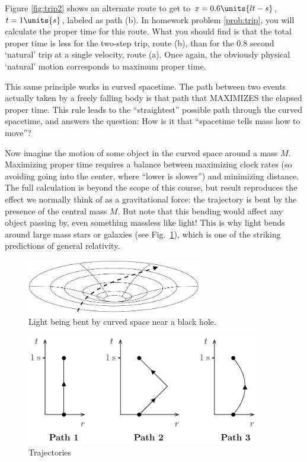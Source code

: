 Figure \ref{fig:trip2} shows an alternate route to get to $x =
0.6\units{lt-s}$, $t = 1\units{s}$, labeled as path (b).  In homework
problem \ref{prob:trip}, you will calculate the proper time for this
route.  What you should find is that the total proper time is less for
the two-step trip, route (b), than for the 0.8 second `natural' trip at a
single velocity, route (a).  Once again, the obviously physical
`natural' motion corresponds to maximum proper time.

This same principle works in curved spacetime.  The path between two
events actually taken by a freely falling body is that path that
MAXIMIZES the elapsed proper time.  This rule leads to the
``straightest'' possible path through the curved spacetime, and
answers the question:  How is it that ``spacetime tells mass how to
move''?

Now imagine the motion of some object in the curved space around a
mass $M$.  Maximizing proper time requires a balance between
maximizing clock rates (so avoiding going into the center, where
``lower is slower'') and minimizing distance.  The full calculation is
beyond the scope of this course, but result reproduces the effect we
normally think of as a gravitational force: the trajectory is bent by
the presence of the central mass $M$.  But note that this bending
would affect any object passing by, even something massless like
light!  This is why light bends around large mass stars or galaxies
(see Fig.~\ref{fig:light-bent-by-curved-space}), which is one of the
striking predictions of general relativity.

\begin{figure}[b]
\begin{center}
\includegraphics[width=3in]{gravity_and_geometry/black-hole-bends-light.pdf}
\end{center}
\caption{Light being bent by curved space near a black hole.}
\label{fig:light-bent-by-curved-space}
\end{figure}



\begin{figure}[t]
\begin{center}
\includegraphics[width=4in]{gravity_and_geometry/trajectory.pdf}
\end{center}
\caption{Trajectories}
\label{fig:trajectories}
\end{figure}
     
